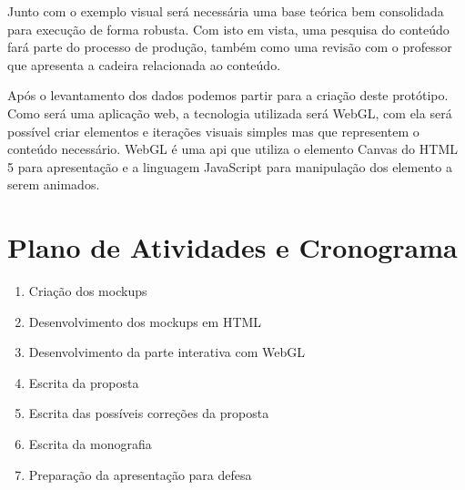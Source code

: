 \documentclass[tcc-proposta]{texufpel}
\begin{document}
Junto com o exemplo visual será necessária uma base teórica bem consolidada para execução de forma robusta. Com isto em vista, uma pesquisa do conteúdo fará parte do processo de produção, também como uma revisão com o professor que apresenta a cadeira relacionada ao conteúdo.

Após o levantamento dos dados podemos partir para a criação deste protótipo. Como será uma aplicação web, a tecnologia utilizada será WebGL, com ela será possível criar elementos e iterações visuais simples mas que representem o conteúdo necessário. WebGL é uma api que utiliza o elemento Canvas do HTML 5 para apresentação e a linguagem JavaScript para manipulação dos elemento a serem animados. 

\chapter{Plano de Atividades e Cronograma}


\begin{enumerate}
    \item Criação dos mockups
    \item Desenvolvimento dos mockups em HTML
    \item Desenvolvimento da parte interativa com WebGL
    \item Escrita da proposta
    \item Escrita das possíveis correções da proposta
    \item Escrita da monografia
    \item Preparação da apresentação para defesa
\end{enumerate}
\end{document}
